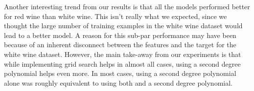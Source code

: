Another interesting trend from our results is that all the models performed better for red wine than white wine. This isn't really what we expected, since we thought the large number of training examples in the white wine dataset would lead to a better model. A reason for this sub-par performance may have been because of an inherent disconnect between the features and the target for the white wine dataset. However, the main take-away from our experiments is that while implementing grid search helps in almost all cases, using a second degree polynomial helps even more. In most cases, using a second degree polynomial alone was roughly equivalent to using both  and a second degree polynomial.


